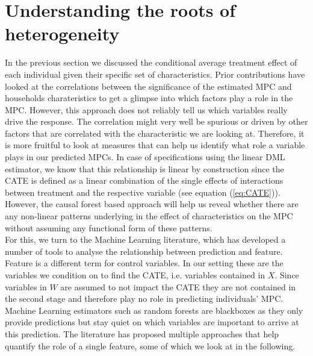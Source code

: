 \section{Understanding the roots of heterogeneity} \label{sec:roots_of_heterogeneity}
In the previous section we discussed the conditional average treatment effect of each individual given their specific set of characteristics. Prior contributions have looked at the correlations between the significance of the estimated MPC and households charateristics to get a glimpse into which factors play a role in the MPC. However, this approach does not reliably tell us which variables really drive the response. The correlation might very well be spurious or driven by other factors that are correlated with the characteristic we are looking at. Therefore, it is more fruitful to look at measures that can help us identify what role a variable plays in our predicted MPCs. In case of specifications using the linear DML estimator, we know that this relationship is linear by construction since the CATE is defined as a linear combination of the single effects of interactions between treatment and the respective variable (see equation (\ref{eq:CATE})). However, the causal forest based approach will help us reveal whether there are any non-linear patterns underlying in the effect of characteristics on the MPC without assuming any functional form of these patterns. \\
For this, we turn to the Machine Learning literature, which has developed a number of tools to analyse the relationship between prediction and feature. Feature is a different term for control variables. In our setting these are the variables we condition on to find the CATE, i.e. variables contained in $X$. Since variables in $W$ are assumed to not impact the CATE they are not contained in the second stage and therefore play no role in predicting individuals' MPC. Machine Learning estimators such as random forests are blackboxes as they only provide predictions but stay quiet on which variables are important to arrive at this prediction. The literature has proposed multiple approaches that help quantify the role of a single feature, some of which we look at in the following. 

